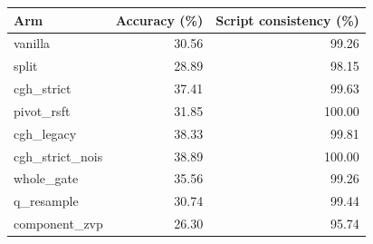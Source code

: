 \begin{tabular}{lrr}
\hline
Arm & Accuracy (\%) & Script consistency (\%) \\
\hline
vanilla & 30.56 & 99.26 \\
split & 28.89 & 98.15 \\
cgh\_strict & 37.41 & 99.63 \\
pivot\_rsft & 31.85 & 100.00 \\
cgh\_legacy & 38.33 & 99.81 \\
cgh\_strict\_nois & 38.89 & 100.00 \\
whole\_gate & 35.56 & 99.26 \\
q\_resample & 30.74 & 99.44 \\
component\_zvp & 26.30 & 95.74 \\
\hline
\end{tabular}
